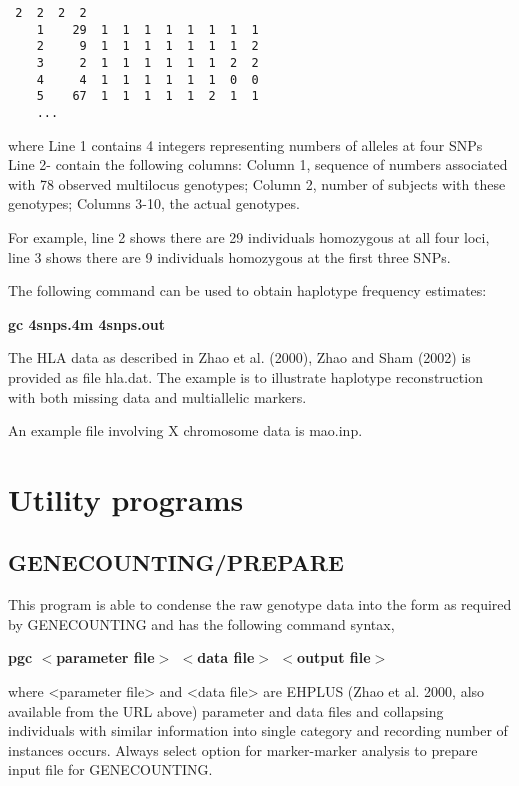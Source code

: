 \documentclass[11pt]{article}
\begin{document}
\begin{verbatim}
 2  2  2  2
    1    29  1  1  1  1  1  1  1  1
    2     9  1  1  1  1  1  1  1  2
    3     2  1  1  1  1  1  1  2  2
    4     4  1  1  1  1  1  1  0  0
    5    67  1  1  1  1  1  2  1  1
    ...
\end{verbatim}

\medskip\noindent where Line 1 contains 4 integers representing numbers of
alleles at four SNPs Line 2- contain the following columns: Column
1, sequence of numbers associated with 78 observed multilocus
genotypes; Column 2, number of subjects with these genotypes;
Columns 3-10, the actual genotypes.

\medskip\noindent For example, line 2 shows there are 29 individuals
homozygous at all four loci, line 3 shows there are 9 individuals
homozygous at the first three SNPs.

\medskip\noindent The following command can be used to obtain haplotype
frequency estimates:

\medskip
{\bf gc 4snps.4m 4snps.out}
\medskip

\medskip\noindent The HLA data as described in Zhao et al.  (2000), Zhao and
Sham (2002) is provided as file hla.dat.  The example is to
illustrate haplotype reconstruction with both missing data and
multiallelic markers.

\medskip\noindent An example file involving X chromosome data is mao.inp.


\section{Utility programs}

\subsection{GENECOUNTING/PREPARE}

\medskip\noindent This program is able to condense the raw genotype data
into the form as required by GENECOUNTING and has the following
command syntax,

\medskip
{\bf pgc $<$parameter file$>$ $<$data file$>$ $<$output file$>$}
\medskip

\medskip\noindent where <parameter file> and <data file> are EHPLUS (Zhao et
al. 2000, also available from the URL above) parameter and data
files and collapsing individuals with similar information into
single category and recording number of instances occurs.  Always
select option for marker-marker analysis to prepare input file for
GENECOUNTING.
\end{document}
